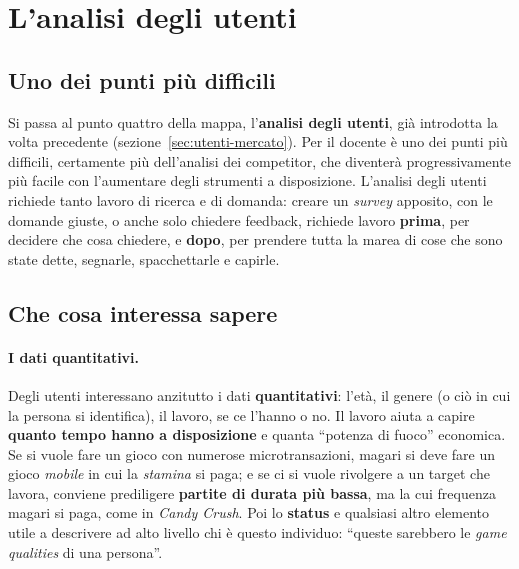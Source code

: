 \section{L'analisi degli utenti}
\label{sec:analisi-utenti}



\subsection{Uno dei punti più difficili}

Si passa al punto quattro della mappa, l'\textbf{analisi degli utenti},
già introdotta la volta precedente (sezione~\ref{sec:utenti-mercato}). Per il
docente è uno dei punti più difficili, certamente più dell'analisi dei
competitor, che diventerà progressivamente più facile con l'aumentare degli
strumenti a disposizione. L'analisi degli utenti richiede tanto lavoro di
ricerca e di domanda: creare un \emph{survey} apposito, con le domande
giuste, o anche solo chiedere feedback, richiede lavoro \textbf{prima}, per
decidere che cosa chiedere, e \textbf{dopo}, per prendere tutta la marea di
cose che sono state dette, segnarle, spacchettarle e capirle.

\subsection{Che cosa interessa sapere}

\paragraph{I dati quantitativi.} Degli utenti interessano anzitutto i dati
\textbf{quantitativi}: l'età, il genere (o ciò in cui la persona si
identifica), il lavoro, se ce l'hanno o no. Il lavoro aiuta a capire
\textbf{quanto tempo hanno a disposizione} e quanta ``potenza di fuoco''
economica. Se si vuole fare un gioco con numerose microtransazioni, magari
si deve fare un gioco \emph{mobile} in cui la \emph{stamina} si paga; e se ci
si vuole rivolgere a un target che lavora, conviene prediligere
\textbf{partite di durata più bassa}, ma la cui frequenza magari si paga, come
in \emph{Candy Crush}. Poi lo \textbf{status} e qualsiasi altro elemento utile
a descrivere ad alto livello chi è questo individuo: ``queste sarebbero le
\emph{game qualities} di una persona''.

